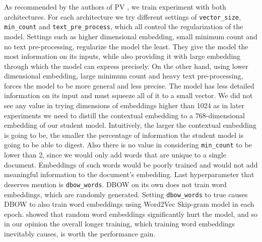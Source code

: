As recommended by the authors of PV \citep{le2014distributed}, we train
experiment with both architectures. For each architecture we try different
settings of \texttt{vector\_size}, \texttt{min\_count} and
\texttt{text\_pre\_process}, which all control the regularization of the model.
Settings such as higher dimensional embedding, small minimum count and no text
pre-processing, regularize the model the least. They give the model the most
information on its inputs, while also providing it with large embedding through
which the model can express precisely. On the other hand, using lower
dimensional embedding, large minimum count and heavy text pre-processing,
forces the model to be more general and less precise. The model has less
detailed information on its input and must squeeze all of it to a small vector.
We did not see any value in trying dimensions of embeddings higher than 1024 as
in later experiments we need to distill the contextual embedding to a
768-dimensional embedding of our student model. Intuitively, the larger the
contextual embedding is going to be, the smaller the percentage of information
the student model is going to be able to digest. Also there is no value in
considering \texttt{min\_count} to be lower than 2, since we would only add
words that are unique to a single document. Embeddings of such words would be
poorly trained and would not add meaningful information to the document's
embedding. Last hyperparameter that deserves mention is \texttt{dbow\_words}.
DBOW on its own does not train word embeddings, which are randomly generated.
Setting \texttt{dbow\_words} to true causes DBOW to also train word embeddings
using Word2Vec Skip-gram model \citep{mikolov2013efficient} in each epoch.
\cite{lau2016empirical} showed that random word embeddings significantly hurt
the model, and so in our opinion the overall longer training, which training
word embeddings inevitably causes, is worth the performance gain.

